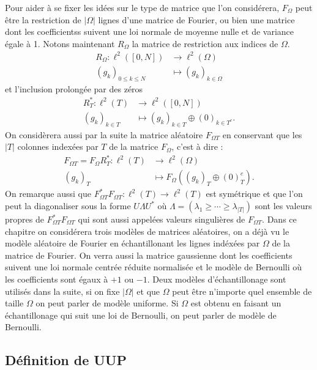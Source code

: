Pour aider à se fixer les idées sur le type de matrice que l'on considérera, $F_\Omega$ peut être la restriction de $|\Omega|$ lignes d'une matrice de Fourier, ou bien une matrice dont les coefficientss suivent une loi normale de moyenne nulle et de variance égale à 1.
\newline
Notons maintenant $R_\Omega$ la matrice de restriction aux indices de $\Omega$.
\begin{align}
	R_\Omega : \ell^2([0, N]) &\longrightarrow \ell^2(\Omega) \\
		(g_k)_{0\leq k\leq N} &\longmapsto (g_k)_{k\in \Omega}
\end{align}
et l'inclusion prolongée par des zéros
\begin{align}
	R_T^* : \ell^2(T) &\longrightarrow \ell^2([0,N])\\
		(g_k)_{k \in T} &\longmapsto (g_k)_{k\in T} \oplus (0)_{k\in T^c}.
\end{align}
On considèrera aussi par la suite la matrice aléatoire $F_{\Omega T}$ en conservant que les $|T|$ colonnes indexées par $T$ de la matrice $F_{\Omega}$, c'est à dire :
\begin{align}
	F_{\Omega T} = F_{\Omega} R_T^* : \ell^2(T) &\longrightarrow \ell^2(\Omega)\\
		(g_k)_T &\longmapsto F_{\Omega}( (g_k)_T \oplus (0)_T^c ).
\end{align}
On remarque aussi que $F_{\Omega T}^* F_{\Omega T} : \ell^2(T) \rightarrow \ell^2(T)$ est symétrique et que l'on peut la diagonaliser sous la forme $U \Lambda U^*$ où $\Lambda = (\lambda_1 \geq \cdots \geq \lambda_{|T|})$ sont les valeurs propres de $F_{\Omega T}^* F_{\Omega T}$ qui sont aussi appelées valeurs singulières de $F_{\Omega T}$.
\newline
Dans ce chapitre on considérera trois modèles de matrices aléatoires, on a déjà vu le modèle aléatoire de Fourier en échantillonant les lignes indéxées par $\Omega$ de la matrice de Fourier.
On verra aussi la matrice gaussienne dont les coefficients suivent une loi normale centrée réduite normalisée et le modèle de Bernoulli où les coefficients sont égaux à $+1$ ou $-1$.
\newline
Deux modèles d'échantillonage sont utilisés dans la suite, si on fixe $|\Omega|$ et que $\Omega$ peut être n'importe quel ensemble de taille $\Omega$ on peut parler de modèle uniforme.
Si $\Omega$ est obtenu en faisant un échantillonage qui suit une loi de Bernoulli, on peut parler de modèle de Bernoulli.
\subsection{Définition de \textbf{UUP}} 


